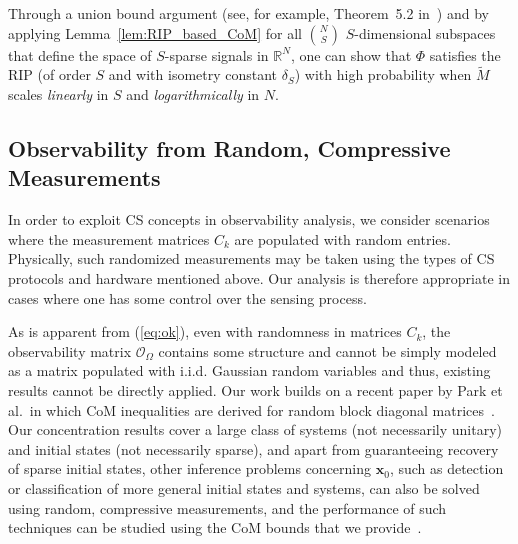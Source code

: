 \documentclass[11pt,draftcls,onecolumn]{IEEEtran}
\def\real    { \mathbb{R} }
\def \ok {{\mathcal{O}_{\Omega}}}
\def \km {{\widetilde{M}}}
\newcommand{\cut}[1]{}
\newcommand{\vc}[1]{\boldsymbol{#1}}
\def\real    { \mathbb{R} }
\begin{document}
Through a union bound argument (see, for example, Theorem~5.2 
in~\cite{baraniuk2008simple}) and by applying Lemma~\ref{lem:RIP_based_CoM} for all $N \choose S$ $S$-dimensional subspaces that define the space of $S$-sparse signals in $\real^N$, one can show that $\Phi$ satisfies the \ac{RIP} (of order $S$ and with isometry constant $\delta_S$) with high probability when $\km$ scales \emph{linearly} in $S$ and \emph{logarithmically} in $N$.
\cut{
Aside from connections to the \ac{RIP}, concentration inequalities such as the above can also be useful when solving other types of inference problems from compressive measurements. For example, rather than recovering a signal $\vc{x}$, one may wish only to solve a binary detection problem and determine whether a set of measurements $\vc{y}$ correspond only to noise (the null hypothesis $\vc{y} = \Phi(\mathrm{noise})$) or to signal plus noise ($\vc{y} = \Phi(\vc{x} + \mathrm{noise})$). When $\Phi$ is random, the performance of a compressive detector (and of other multi-signal classifiers) can be studied using concentration inequalities~\cite{davenport2010signal}, and in these settings it is not necessary to assume that $\vc{x}$ is sparse.
}
\subsection{Observability from Random, Compressive Measurements}

In order to exploit CS concepts in observability analysis, we consider scenarios where the measurement matrices $C_k$ are populated with random entries. Physically, such randomized measurements may be taken using the types of CS protocols and hardware mentioned above. Our analysis is therefore appropriate in cases where one has some control over the sensing process.

As is apparent from (\ref{eq:ok}), even with randomness in matrices $C_k$, the observability matrix $\ok$ contains some structure and cannot be simply modeled as a matrix populated with \ac{i.i.d.} Gaussian random variables and thus, existing results cannot be directly applied.
Our work builds on a recent paper by Park et al.\ in which \ac{CoM} inequalities are derived for random block diagonal matrices~\cite{park2011block}.
Our concentration results cover a large class of systems (not necessarily unitary) and initial states (not necessarily sparse), and apart from guaranteeing recovery of sparse initial states, other inference problems concerning $\vc{x}_0$, such as detection or classification of more general initial states and systems, can also be solved using random, compressive measurements, and the performance of such techniques can be studied using the \ac{CoM} bounds that we provide~\cite{davenport2010signal}.
\end{document}
